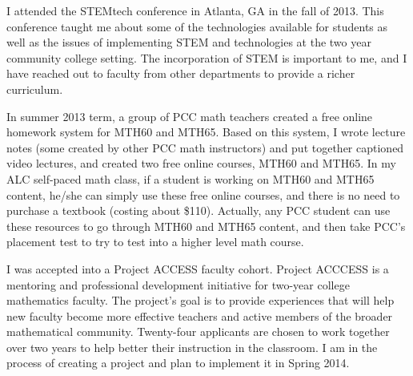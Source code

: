 \begin{description}[style=nextline]
	I attended the STEMtech conference in Atlanta, GA in the fall of 2013. This
	conference taught me about some of the technologies available for students as
	well as the issues of implementing STEM and technologies at the two year
	community college setting. The incorporation of STEM is important to me, and I
	have reached out to faculty from other departments to provide a richer
	curriculum.

	\item[Carl Yao (Full-Time Instructor, Southeast Campus)]
	In summer 2013 term, a group of PCC math teachers created a free online
	homework system for MTH60 and MTH65. Based on this system, I wrote lecture
	notes (some created by other PCC math instructors) and put together captioned
	video lectures, and created two free online courses, MTH60 and MTH65.  In my
	ALC self-paced math class, if a student is working on MTH60 and MTH65 content,
	he/she can simply use these free online courses, and there is no need to
	purchase a textbook (costing about \$110).  Actually, any PCC student can use
	these resources to go through MTH60 and MTH65 content, and then take PCC's
	placement test to try to test into a higher level math course.

	\item[Stephanie Yurasits (Full-Time Instructor, Southeast Campus)]
	I was accepted into a Project ACCESS faculty cohort.  Project ACCCESS is a
	mentoring and professional development initiative for two-year college
	mathematics faculty. The project's goal is to provide experiences that will
	help new faculty become more effective teachers and active members of the
	broader mathematical community.  Twenty-four applicants are chosen to work
	together over two years to help better their instruction in the classroom.  I
	am in the process of creating a project and plan to implement it in Spring
	2014.
\end{description}
